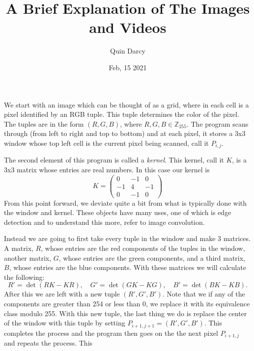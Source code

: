 \documentclass[12pt]{article}
\theoremstyle{definition}
\theoremstyle{definition}
\begin{document}
\title{A Brief Explanation of The Images and Videos}
\author{Quin Darcy}
\date{Feb, 15 2021}
\maketitle
    We start with an image which can be thought of as a grid, where in each cell is
    a pixel identified by an RGB tuple. This tuple determines the color of the
    pixel. The tuples are in the form $(R, G, B)$, where $R, G,
    B\in\mathbb{Z}_{255}$. The program scans through (from left to right and
    top to bottom) and at each pixel, it stores a 3x3 window whose top left
    cell is the current pixel being scanned, call it $P_{i, j}$. \par The
    second element of this program is called a \textit{kernel}. This kernel,
    call it $K$,  is
    a 3x3 matrix whose entries are real numbers. In this case our kernel is 
        \begin{equation*}
            K=\begin{pmatrix}0 & -1 & 0 \\ -1 & 4 & -1 \\ 0 & -1 & 0 \end{pmatrix} 
        \end{equation*}
    From this point forward, we deviate quite a bit from what is typically done
    with the window and kernel. These objects have many uses, one of which is
    edge detection and to understand this more, refer to image
    convolution.\par Instead we are going to first take every tuple in the
    window and make 3 matrices. A matrix, $R$, whose entries are the red
    components of the
    tuples in the window, another matrix, $G$, whose entries are the green components, and a third
    matrix, $B$, whose entries are the blue components. With these matrices we will
    calculate the following:
        \begin{equation*}
            R'=\det(RK-KR), \quad G'=\det(GK-KG), \quad B'=\det(BK-KB).
        \end{equation*}
    After this we are left with a new tuple $(R', G', B')$. Note that we 
    if any of the components are greater than 254 or less than 0, we replace it
    with its equivalence class modulo 255. With this new tuple, the last thing
    we do is replace the center of the window with this tuple by setting
    $P_{i+1, j+1}=(R', G', B')$. This completes the process and the program
    then goes on the the next pixel $P_{i+1, j}$ and repeats the process. This
\end{document}
